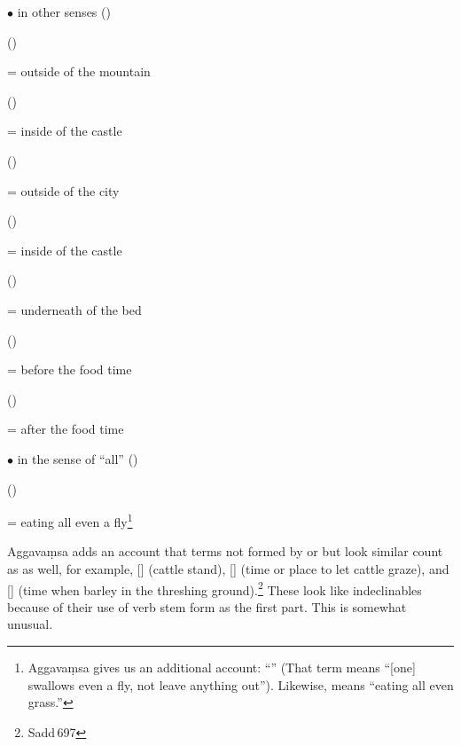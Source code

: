 $\bullet$ in other senses ()\par
{} ()\par \hspace{3mm} = outside of the mountain\par
{} ()\par \hspace{3mm} = inside of the castle\par
{} ()\par \hspace{3mm} = outside of the city\par
{} ()\par \hspace{3mm} = inside of the castle\par
{} ()\par \hspace{3mm} = underneath of the bed\par
{} ()\par \hspace{3mm} = before the food time\par
{} ()\par \hspace{3mm} = after the food time\par

$\bullet$  in the sense of ``all'' ()\par
{} ()\par \hspace{3mm} = eating all even a fly\footnote{Aggava\d msa gives us an additional account: ``'' (That term means ``[one] swallows even a fly, not leave anything out''). Likewise,  means ``eating all even grass.''}\par

Aggava\d msa adds an account that terms not formed by  or  but look similar count as  as well, for example,  [] (cattle stand),  [{}] (time or place to let cattle graze), and  [] (time when barley in the threshing ground).\footnote{Sadd\,697} These look like indeclinables because of their use of verb stem form as the first part. This is somewhat unusual.

